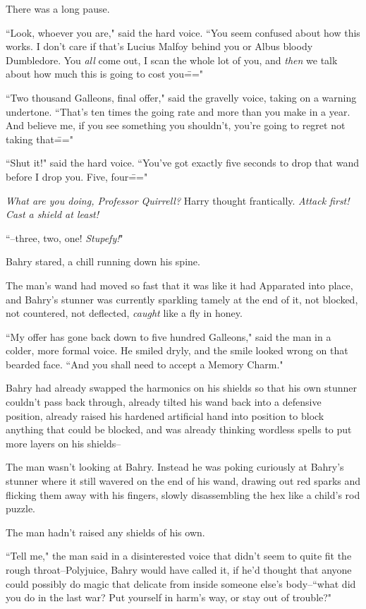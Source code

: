 There was a long pause.

``Look, whoever you are," said the hard voice. ``You seem confused about how this works. I don't care if that's Lucius Malfoy behind you or Albus bloody Dumbledore. You \emph{all} come out, I scan the whole lot of you, and \emph{then} we talk about how much this is going to cost you\==="

``Two thousand Galleons, final offer," said the gravelly voice, taking on a warning undertone. ``That's ten times the going rate and more than you make in a year. And believe me, if you see something you shouldn't, you're going to regret not taking that\==="

``Shut it!" said the hard voice. ``You've got exactly five seconds to drop that wand before I drop you. Five, four\==="

\emph{What are you doing, Professor Quirrell?} Harry thought frantically. \emph{Attack first! Cast a shield at least!}

``\---three, two, one! \emph{Stupefy!}"

\later

Bahry stared, a chill running down his spine.

The man's wand had moved so fast that it was like it had Apparated into place, and Bahry's stunner was currently sparkling tamely at the end of it, not blocked, not countered, not deflected, \emph{caught} like a fly in honey.

``My offer has gone back down to five hundred Galleons," said the man in a colder, more formal voice. He smiled dryly, and the smile looked wrong on that bearded face. ``And you shall need to accept a Memory Charm."

Bahry had already swapped the harmonics on his shields so that his own stunner couldn't pass back through, already tilted his wand back into a defensive position, already raised his hardened artificial hand into position to block anything that could be blocked, and was already thinking wordless spells to put more layers on his shields\---

The man wasn't looking at Bahry. Instead he was poking curiously at Bahry's stunner where it still wavered on the end of his wand, drawing out red sparks and flicking them away with his fingers, slowly disassembling the hex like a child's rod puzzle.

The man hadn't raised any shields of his own.

``Tell me," the man said in a disinterested voice that didn't seem to quite fit the rough throat\---Polyjuice, Bahry would have called it, if he'd thought that anyone could possibly do magic that delicate from inside someone else's body\---``what did you do in the last war? Put yourself in harm's way, or stay out of trouble?"

